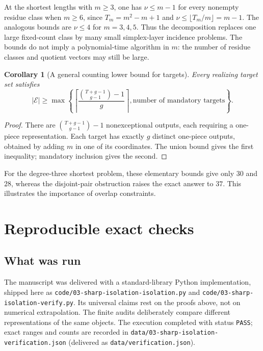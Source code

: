 \documentclass[11pt,letterpaper]{article}
\newtheorem{corollary}[theorem]{Corollary}
\theoremstyle{definition}\newtheorem{definition}[theorem]{Definition}
\theoremstyle{remark}\newtheorem{remark}[theorem]{Remark}
\theoremstyle{definition}\newtheorem{question}[theorem]{Question}
\newcommand{\bpE}{\mathcal E}
\begin{document}
At the shortest lengths with $m\geq3$, one has $\nu\leq m-1$ for every
nonempty residue class when $m\geq6$, since
$T_m=m^2-m+1$ and $\nu\leq\lfloor T_m/m\rfloor=m-1$.
The analogous bounds are $\nu\leq4$ for $m=3,4,5$.
Thus the decomposition replaces one large fixed-count class by many small
simplex-layer incidence problems. The bounds do not imply a polynomial-time
algorithm in $m$: the number of residue classes and quotient vectors may
still be large.

\begin{corollary}[A general counting lower bound for targets]\label{ids:si:cor:targetlower}
Every realizing target set satisfies
\begin{equation}\label{ids:si:eq:targetlower}
 |\bpE|\geq\max\left\{
 \left\lceil\frac{\binom{T+g-1}{g-1}-1}{g}\right\rceil,
 \text{number of mandatory targets}\right\}.
\end{equation}
\end{corollary}
\begin{proof}
There are $\binom{T+g-1}{g-1}-1$ nonexceptional outputs, each requiring a
one-piece representation. Each target has exactly $g$ distinct one-piece
outputs, obtained by adding $m$ in one of its coordinates. The union bound
gives the first inequality; mandatory inclusion gives the second.
\end{proof}
For the degree-three shortest problem, these elementary bounds give only
$30$ and $28$, whereas the disjoint-pair obstruction raises the exact answer
to $37$. This illustrates the importance of overlap constraints.

\section{Reproducible exact checks}\label{ids:si:sec:verification}

\subsection{What was run}
The manuscript was delivered with a standard-library Python implementation,
shipped here as \nolinkurl{code/03-sharp-isolation-isolation.py} and
\nolinkurl{code/03-sharp-isolation-verify.py}. Its universal
claims rest on the proofs above, not on numerical extrapolation. The finite
audits deliberately compare different representations of the same objects.
The execution completed with status \texttt{PASS}; exact ranges and counts
are recorded in \nolinkurl{data/03-sharp-isolation-verification.json}
(delivered as \texttt{data/verification.json}).
\end{document}
